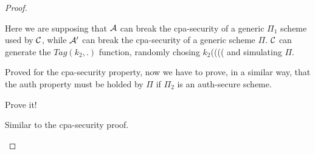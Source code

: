 \begin{proof}
\begin{figure}[h!]
\end{figure}

Here we are supposing that $\mathcal{A}$ can break the cpa-security of a generic $\Pi_{1}$ scheme used by $\mathcal{C}$, while $\mathcal{A}'$ can break the cpa-security of a generic scheme $\Pi$. $\mathcal{C}$ can generate the $Tag(k_{2},.)$ function, randomly chosing $k_{2}$(((( and simulating $\Pi$.


Proved for the cpa-security property, now we have to prove, in a similar way,
that the auth property must be holded by $\Pi$ if $\Pi_{2}$ is an auth-secure
scheme.
\begin{exercise}
    Prove it!

    Similar to the cpa-security proof.
\end{exercise}


\end{proof}
